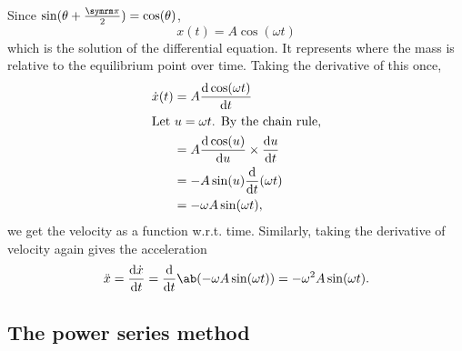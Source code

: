 Since \(\sin(\theta + \frac{\cpi}{2}) = \cos(\theta)\),
\begin{equation}
  x(t) = A\cos(\omega t) \label{eq:harmonic-oscillator-solution}
\end{equation}
which is the solution of the differential equation. It represents where the mass is relative to the equilibrium point over time. Taking the derivative of this once,
\begin{align}
  \dot{x}(t) & = A\odv{\cos(\omega t)}{t}                                         \\
  \intertext{Let \(u = \omega t\). By the chain rule,}
             & = A\odv{\cos(u)}{u} \times \odv{u}{t}                              \\
             & = -A\sin(u) \odv*{(\omega t)}{t}                                   \\
             & = -\omega A\sin(\omega t), \label{eq:harmonic-oscillator-velocity}
\end{align}
we get the velocity as a function w.r.t. time. Similarly, taking the derivative of velocity again gives the acceleration
\begin{equation}
  \ddot{x} = \odv{\dot{x}}{t} = \odv*{\ab(-\omega A\sin(\omega t))}{t} = -\omega^2A\sin(\omega t). \label{eq:harmonic-oscillator-acceleration}
\end{equation}

\subsection{The power series method}

